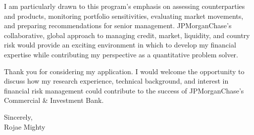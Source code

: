 \documentclass[10pt,letterpaper]{article}
\begin{document}
I am particularly drawn to this program's emphasis on assessing counterparties and products, monitoring portfolio sensitivities, evaluating market movements, and preparing recommendations for senior management. JPMorganChase's collaborative, global approach to managing credit, market, liquidity, and country risk would provide an exciting environment in which to develop my financial expertise while contributing my perspective as a quantitative problem solver.

Thank you for considering my application. I would welcome the opportunity to discuss how my research experience, technical background, and interest in financial risk management could contribute to the success of JPMorganChase's Commercial \& Investment Bank.

\vspace{4pt}
Sincerely,\\[12pt]
Rojae Mighty
\end{document}
